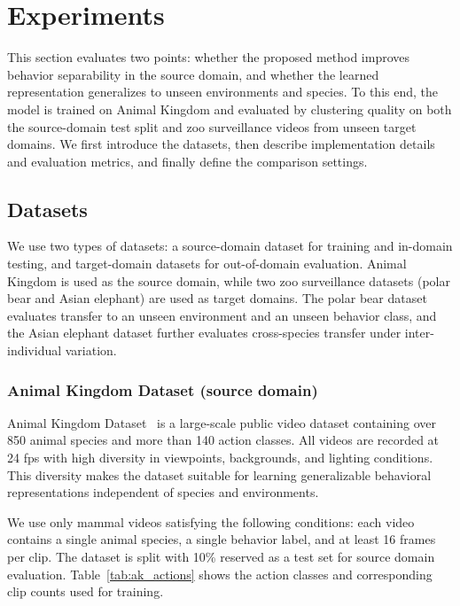 \documentclass[twocolumn]{svjour3}
\begin{document}
\section{Experiments}
\label{sec:experiments}

This section evaluates two points: whether the proposed method improves behavior separability in the source domain, and whether the learned representation generalizes to unseen environments and species.
To this end, the model is trained on Animal Kingdom and evaluated by clustering quality on both the source-domain test split and zoo surveillance videos from unseen target domains.
We first introduce the datasets, then describe implementation details and evaluation metrics, and finally define the comparison settings.

\subsection{Datasets}

We use two types of datasets: a source-domain dataset for training and in-domain testing, and target-domain datasets for out-of-domain evaluation.
Animal Kingdom is used as the source domain, while two zoo surveillance datasets (polar bear and Asian elephant) are used as target domains.
The polar bear dataset evaluates transfer to an unseen environment and an unseen behavior class, and the Asian elephant dataset further evaluates cross-species transfer under inter-individual variation.

\subsubsection{Animal Kingdom Dataset (source domain)}

Animal Kingdom Dataset~\cite{ng2022animal} is a large-scale public video dataset containing over 850 animal species and more than 140 action classes.
All videos are recorded at 24 fps with high diversity in viewpoints, backgrounds, and lighting conditions.
This diversity makes the dataset suitable for learning generalizable behavioral representations independent of species and environments.

We use only mammal videos satisfying the following conditions: each video contains a single animal species, a single behavior label, and at least 16 frames per clip.
The dataset is split with 10\% reserved as a test set for source domain evaluation.
Table~\ref{tab:ak_actions} shows the action classes and corresponding clip counts used for training.
\end{document}
